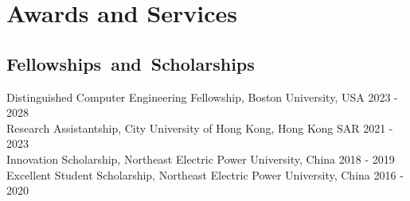 \documentclass{my_cv}
\begin{document}
\hspace*{\fill}


%


\section{\textbf{Awards and Services}}
\subsection{\textbf{Fellowships~and~Scholarships}}
\noindent Distinguished Computer Engineering Fellowship, Boston University, USA \hfill 2023 - 2028 \\
Research Assistantship, City University of Hong Kong, Hong Kong SAR \hfill 2021 - 2023 \\
Innovation Scholarship, Northeast Electric Power University, China \hfill 2018 - 2019\\
Excellent Student Scholarship, Northeast Electric Power University, China \hfill 2016 - 2020
\end{document}
